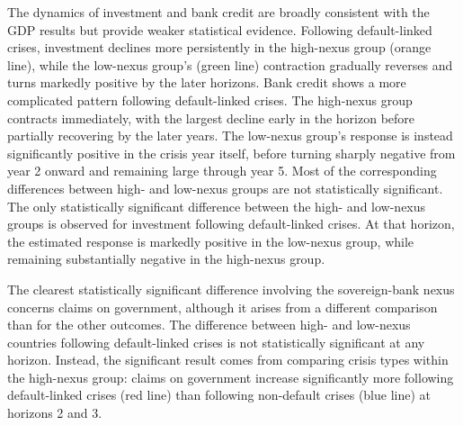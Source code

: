 \documentclass[12pt]{article}
\begin{document}
The dynamics of investment and bank credit are broadly consistent with
the GDP results but provide weaker statistical evidence. Following
default-linked crises, investment declines more persistently in the
high-nexus group (orange line), while the low-nexus group's (green line)
contraction gradually reverses and turns markedly positive by the later
horizons. Bank credit shows a more complicated pattern following
default-linked crises. The high-nexus group contracts immediately, with
the largest decline early in the horizon before partially recovering by
the later years. The low-nexus group's response is instead significantly
positive in the crisis year itself, before turning sharply negative from
year 2 onward and remaining large through year 5. Most of the
corresponding differences between high- and low-nexus groups are not
statistically significant. The only statistically significant difference
between the high- and low-nexus groups is observed for investment
following default-linked crises. At that horizon, the estimated response
is markedly positive in the low-nexus group, while remaining
substantially negative in the high-nexus group.

The clearest statistically significant difference involving the sovereign-bank nexus concerns claims on government, although it arises from a different comparison than for the other outcomes. The difference between high- and low-nexus countries following default-linked crises is not statistically significant at any horizon. Instead, the significant result comes from comparing crisis types within the high-nexus group: claims on government increase significantly more following default-linked crises (red line) than following non-default crises (blue line) at horizons 2 and 3.
\end{document}

